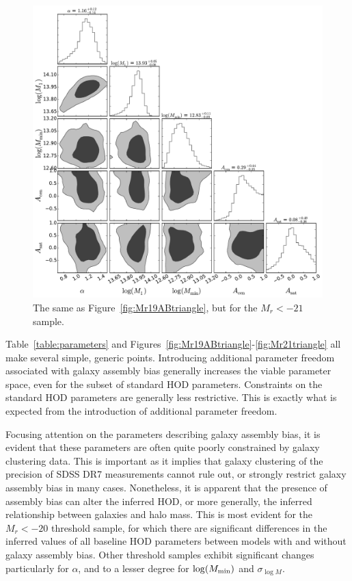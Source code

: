 \documentclass[usenatbib,usegraphicx,letterpaper]{mn2e}
\begin{document}
\begin{figure}
\begin{center}
\includegraphics[width=15.0cm]{Mr21ABTri.pdf}
\caption{
The same as Figure~\ref{fig:Mr19ABtriangle}, but for the $M_r<-21$ sample.
}
\label{fig:Mr21ABtriangle}
\end{center}
\end{figure}


Table~\ref{table:parameters} and Figures~\ref{fig:Mr19ABtriangle}-\ref{fig:Mr21triangle} 
all make several simple, generic points. Introducing additional parameter 
freedom associated with galaxy assembly bias generally increases the viable parameter 
space, even for the subset of standard HOD parameters. Constraints on the 
standard HOD parameters are generally less restrictive. This is exactly what is 
expected from the introduction of additional parameter freedom. 


Focusing attention on the parameters describing galaxy assembly bias, it is 
evident that these parameters are often quite poorly constrained by galaxy 
clustering data. This is important as it implies that galaxy clustering of the precision 
of SDSS DR7 measurements cannot rule out, or strongly restrict galaxy assembly 
bias in many cases. Nonetheless, it is apparent that the presence of assembly bias 
can alter the inferred HOD, or more generally, the inferred relationship between 
galaxies and halo mass. This is most evident for the $M_r < -20$ threshold sample, 
for which there are significant differences in the inferred values of all baseline HOD 
parameters between models with and without galaxy assembly bias. Other threshold 
samples exhibit significant changes particularly for $\alpha$, and to a lesser degree 
for $\log (M_{\rm min})$ and $\sigma_{\log M}$. 
\end{document}
